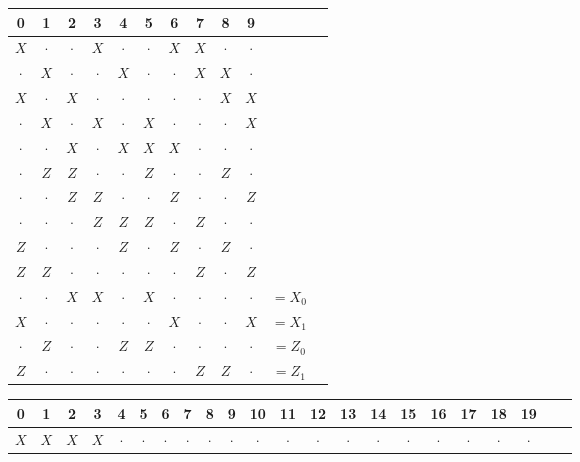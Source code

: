 \begin{table}

\begin{minipage}{0.33\textwidth}
\raggedleft
\begin{tabular}{cccccccccccc}
0 & 1 & 2 & 3 & 4 & 5 & 6 & 7 & 8 & 9 & \\
\hline
$X$& $\cdot$& $\cdot$& $X$& $\cdot$& $\cdot$& $X$& $X$& $\cdot$& $\cdot$&\\
$\cdot$& $X$& $\cdot$& $\cdot$& $X$& $\cdot$& $\cdot$& $X$& $X$& $\cdot$&\\
$X$& $\cdot$& $X$& $\cdot$& $\cdot$& $\cdot$& $\cdot$& $\cdot$& $X$& $X$&\\
$\cdot$& $X$& $\cdot$& $X$& $\cdot$& $X$& $\cdot$& $\cdot$& $\cdot$& $X$&\\
$\cdot$& $\cdot$& $X$& $\cdot$& $X$& $X$& $X$& $\cdot$& $\cdot$& $\cdot$&\\
\hline
$\cdot$& $Z$& $Z$& $\cdot$& $\cdot$& $Z$& $\cdot$& $\cdot$& $Z$& $\cdot$&\\
$\cdot$& $\cdot$& $Z$& $Z$& $\cdot$& $\cdot$& $Z$& $\cdot$& $\cdot$& $Z$&\\
$\cdot$& $\cdot$& $\cdot$& $Z$& $Z$& $Z$& $\cdot$& $Z$& $\cdot$& $\cdot$&\\
$Z$& $\cdot$& $\cdot$& $\cdot$& $Z$& $\cdot$& $Z$& $\cdot$& $Z$& $\cdot$&\\
$Z$& $Z$& $\cdot$& $\cdot$& $\cdot$& $\cdot$& $\cdot$& $Z$& $\cdot$& $Z$&\\
\hline
$\cdot$& $\cdot$& $X$& $X$& $\cdot$& $X$& $\cdot$& $\cdot$& $\cdot$& $\cdot$& $=X_0$\\
$X$& $\cdot$& $\cdot$& $\cdot$& $\cdot$& $\cdot$& $X$& $\cdot$& $\cdot$& $X$& $=X_1$\\
$\cdot$& $Z$& $\cdot$& $\cdot$& $Z$& $Z$& $\cdot$& $\cdot$& $\cdot$& $\cdot$& $=Z_0$\\
$Z$& $\cdot$& $\cdot$& $\cdot$& $\cdot$& $\cdot$& $\cdot$& $Z$& $Z$& $\cdot$& $=Z_1$\\
\end{tabular}
\end{minipage}
\hfill
\begin{minipage}{0.6\textwidth}
\raggedright
\begin{tabular}{cccccccccccccccccccccc}
0 & 1 & 2 & 3 & 4 & 5 & 6 & 7 & 8 & 9 & 10 & 11 & 12 & 13 & 14 & 15 & 16 & 17 & 18 & 19 & \\
\hline
$X$& $X$& $X$& $X$& $\cdot$& $\cdot$& $\cdot$& $\cdot$& $\cdot$& $\cdot$& $\cdot$& $\cdot$& $\cdot$& $\cdot$& $\cdot$& $\cdot$& $\cdot$& $\cdot$& $\cdot$& $\cdot$&\\

\end{tabular}
\end{minipage}
\end{table}
